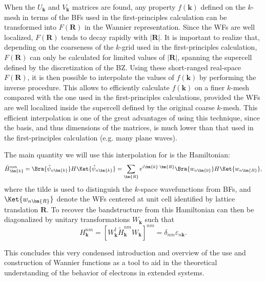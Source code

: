 When the $U_{\bm{k}}$ and $V_{\bm{k}}$ matrices are found, any property $f(\bm{k})$ defined on the $k$-mesh in terms of the BFs used in the first-principles calculation can be transformed into $F(\bm{R})$ in the Wannier representation.
Since the WFs are well localized, $F(\bm{R})$ tends to decay rapidly with $|\bm{R}|$.
It is important to realize that, depending on the coarseness of the $k$-grid used in the first-principles calculation, $F(\bm{R})$ can only be calculated for limited values of $|\bm{R}|$, spanning the supercell defined by the discretization of the BZ.
Using these short-ranged real-space $F(\bm{R})$, it is then possible to interpolate the values of $f(\bm{k})$ by performing the inverse procedure. This allows to efficiently calculate $f(\bm{k})$ on a finer $k$-mesh compared with the one used in the first-principles calculations, provided the WFs are well localized inside the supercell defined by the original coarse $k$-mesh.
This efficient interpolation is one of the great advantages of using this technique, since the basis, and thus dimensions of the matrices, is much lower than that used in the first-principles calculation (e.g. many plane waves). 

The main quantity we will use this interpolation for is the Hamiltonian:
\begin{equation}
	\tilde{H}^{nm}_{\bm{k}} = \Bra{\tilde{\psi}_{n\bm{k}}} H  \Ket{\tilde{\psi}_{n\bm{k}}} = \sum_{\bm{R}} e^{i \bm{k} \cdot \bm{R}} \Bra{w_{n\bm{0}}}H\Ket{w_{n\bm{R}}},
\end{equation}
where the tilde is used to distinguish the $k$-space wavefunctions from BFs, and $\Ket{w_{n\bm{R}}}$ denote the WFs centered at unit cell identified by lattice translation $\bm{R}$.
To recover the bandstructure from this Hamiltonian can then be diagonalized by unitary transformations $W_{\bm{k}}$ such that
\begin{equation}
H^{nm}_{\bm{k}} = [W^{\dagger}_{\bm{k}} \tilde{H}^{nm}_{\bm{k}} W_{\bm{k}}]^{nm} = \delta_{nm} \varepsilon_{n\bm{k}}.
\end{equation}

This concludes this very condensed introduction and overview of the use and construction of Wannier functions as a tool to aid in the theoretical understanding of the behavior of electrons in extended systems.


